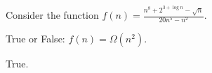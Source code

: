 \begin{prob}
    Consider the function $f(n) = \frac{n^8 + 2^{3 + \log n} - \sqrt n}{20 n^5 - n^2}$.

    True or False: $f(n) = \Omega(n^2)$.

    \Tf{}

    \begin{soln}
        True.
    \end{soln}
\end{prob}
